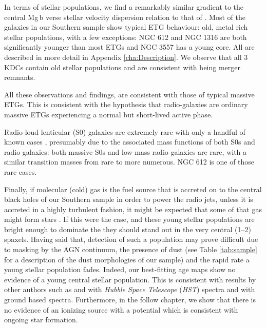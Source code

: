 	In terms of stellar populations, we find a remarkably similar gradient to the central Mg\,b verse stellar velocity dispersion relation to that of \citet{Ziegler1997}. Most of the galaxies in our Southern sample show typical ETG behaviour: old, metal rich stellar populations, with a few exceptions: NGC 612 and NGC 1316 are both significantly younger than most ETGs and NGC 3557 has a young core. All are described in more detail in Appendix \ref{cha:Description}. We observe that all 3 KDCs contain old stellar populations and are consistent with being merger remnants. 

	All these observations and findings, are consistent with those of typical massive ETGs. This is consistent with the hypothesis that radio-galaxies are ordinary massive ETGs experiencing a normal but short-lived active phase. 

	Radio-loud lenticular (S0) galaxies are extremely rare with only a handful of known cases \citep[e.g.][]{Heckman1982, Morganti2011}, presumably due to the associated mass functions of both S0s and radio galaxies: both massive S0s and low-mass radio galaxies are rare, with a similar transition masses from rare to more numerous. NGC 612 is one of those rare cases.

	Finally, if molecular (cold) gas is the fuel source that is accreted on to the central black holes of our Southern sample in order to power the radio jets, unless it is accreted in a highly turbulent fashion, it might be expected that some of that gas might form stars \citep[e.g.][]{Collin1999, Diamond-Stanic2012, LaMassa2013}. If this were the case, and these young stellar populations are bright enough to dominate the they should stand out in the very central (1--2) spaxels. Having said that, detection of such a population may prove difficult due to masking by the AGN continuum, the presence of dust (see Table \ref{tab:sample} for a description of the dust morphologies of our sample) and the rapid rate a young stellar population fades. Indeed, our best-fitting age maps show no evidence of a young central stellar population. This is consistent with results by other authors such as \citet{GonzalezDelgado2004} and \citet{Sarzi2005b} with \textit{Hubble Space Telescope} (\textit{HST}) spectra and \citet{CidFernandes2004} with ground based spectra. Furthermore, in the follow chapter, we show that there is no evidence of an ionizing source with a potential which is consistent with ongoing star formation. 